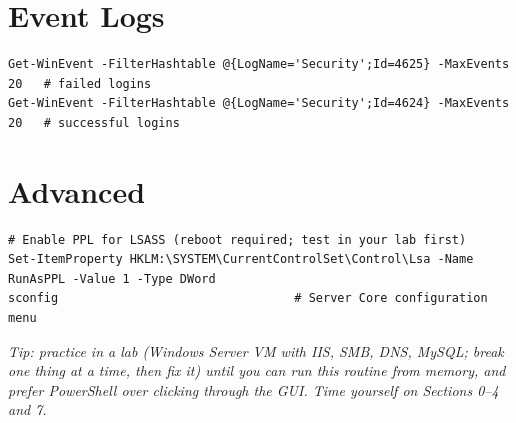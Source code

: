 \documentclass[11pt]{article}
\begin{document}
\section*{Event Logs}
{\footnotesize
\begin{verbatim}
Get-WinEvent -FilterHashtable @{LogName='Security';Id=4625} -MaxEvents 20   # failed logins
Get-WinEvent -FilterHashtable @{LogName='Security';Id=4624} -MaxEvents 20   # successful logins
\end{verbatim}
}

\section*{Advanced}
{\footnotesize
\begin{verbatim}
# Enable PPL for LSASS (reboot required; test in your lab first)
Set-ItemProperty HKLM:\SYSTEM\CurrentControlSet\Control\Lsa -Name RunAsPPL -Value 1 -Type DWord
sconfig                                 # Server Core configuration menu
\end{verbatim}
}

\vfill
\small\textit{Tip: practice in a lab (Windows Server VM with IIS, SMB, DNS, MySQL; break one thing at a time, then fix it) until you can run this routine from memory, and prefer PowerShell over clicking through the GUI. Time yourself on Sections 0--4 and 7.}
\end{document}
